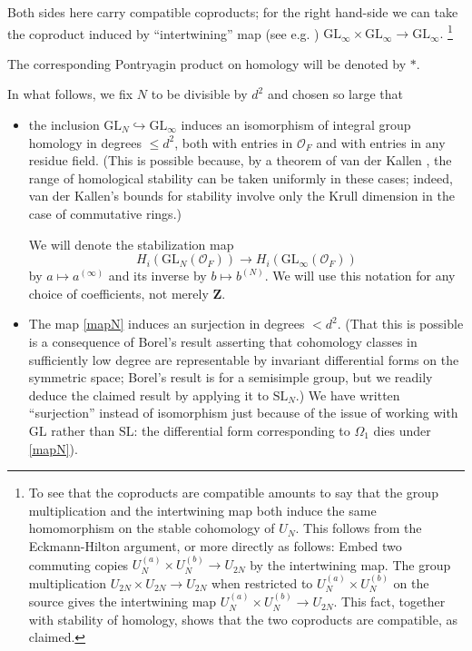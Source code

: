 \documentclass[10pt]{amsart}
\newcommand{\Z}{\mathbf{Z}}
\newcommand{\SL}{\mathrm{SL}}
\newcommand{\OO}{\mathcal{O}}
\newcommand{\GL}{\mathrm{GL}}
\theoremstyle{remark}
\begin{document}
 
 Both sides here  carry compatible coproducts;  for the right hand-side we can take the coproduct induced by  ``intertwining'' map  (see e.g. \cite[Chapter 2]{Srinivas})
 $\GL_{\infty} \times \GL_{\infty} \rightarrow \GL_{\infty}.$   \footnote{To see that the coproducts are compatible amounts to say that
 the group multiplication and the intertwining map both induce the same homomorphism on the stable cohomology of $U_N$. 
 This follows from the Eckmann-Hilton argument, or more directly as follows: Embed two commuting copies $U_N^{(a)} \times U_N^{(b)} \rightarrow U_{2N}$
 by the intertwining map. The group multiplication $U_{2N} \times U_{2N} \rightarrow U_{2N}$  when
 restricted to $U_N^{(a)} \times U_N^{(b)}$ on the source gives  the intertwining map   $U_N^{(a)} \times U_N^{(b)} \rightarrow U_{2N}$. This fact, together with stability of homology, shows that the two coproducts are compatible, as claimed.}
  
The corresponding Pontryagin product on homology will be denoted by $*$. 
 

In what follows,  we fix $N$ to be divisible by $d^2$ and chosen so large that
\begin{itemize}
\item[-]  the inclusion $\GL_N \hookrightarrow \GL_{\infty}$
induces an isomorphism of integral group homology in degrees $\leq d^2$, both
with entries in $\mathcal{O}_F$ and with entries in any residue field. (This is possible because,
by a theorem of van der Kallen \cite[p. 289]{vdK}, the range of homological stability
can be taken uniformly in these cases; indeed, van der Kallen's bounds for stability involve
only the Krull dimension in the case of commutative rings.) 

 

We will denote the stabilization map  
$$H_i(\GL_N(\OO_F)) \rightarrow H_i(\GL_{\infty}(\OO_F))$$
by $a \mapsto a^{(\infty)}$ and its inverse by $b \mapsto b^{(N)}$. 
We will use this notation for any choice of coefficients, not merely $\Z$. 
 

\item[-]
The map \eqref{mapN} induces an surjection in degrees   $< d^2$. (That this is possible is a consequence of Borel's result \cite[(7.5)]{Borel} asserting that cohomology classes 
in sufficiently low degree are representable by invariant differential forms on the symmetric space; Borel's result is for a semisimple group, but we readily deduce the claimed result by applying it to $\SL_N$.)  We have written ``surjection'' instead of isomorphism
just because of the issue of working with $\GL$ rather than $\SL$: the differential form corresponding to $\Omega_1$
dies under \eqref{mapN}). 
\end{itemize}
\end{document}
